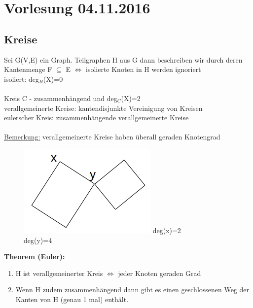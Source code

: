 \section{Vorlesung 04.11.2016}
\subsection{Kreise}
Sei G(V,E) ein Graph. Teilgraphen H aus G dann beschreiben wir durch deren Kantenmenge F $\subseteq$ E $\Leftrightarrow$ isolierte Knoten in H werden ignoriert\\
isoliert: deg$_H$(X)=0
\\\\
Kreis C - zusammenhängend und deg$_C$(X)=2\\
verallgemeinerte Kreise: kantendisjunkte Vereinigung von Kreisen\\
eulerscher Kreis: zusammenhängende verallgemeinerte Kreise\\
\\
\underline{Bemerkung:} verallgemeinerte Kreise haben überall geraden Knotengrad
\begin{figure}[htp]
\centering
\includegraphics[scale=0.75]{lectures/161104/pix/pic1.jpg}
deg(x)=2\\
deg(y)=4
\end{figure}

\textbf{Theorem (Euler):}
\begin{enumerate}
	\item H ist verallgemeinerter Kreis $\Leftrightarrow$ jeder Knoten geraden Grad
	\item Wenn H zudem zusammenhängend dann gibt es einen geschlossenen Weg der Kanten von H (genau 1 mal) enthält.
\end{enumerate}

